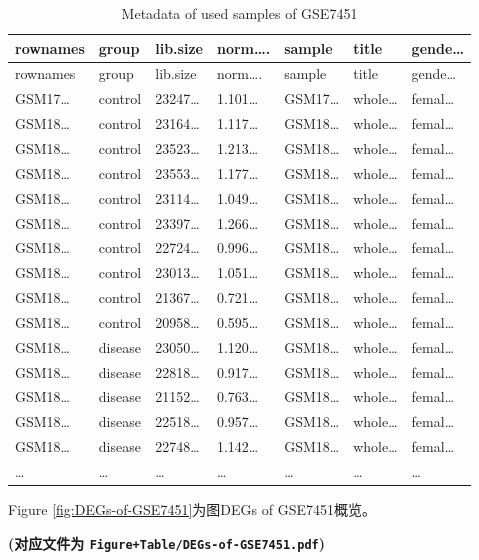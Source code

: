 \documentclass[
]{article}
\begin{document}
\begin{longtable}[]{@{}lllllll@{}}
\caption{\label{tab:metadata-of-used-samples-of-GSE7451}Metadata of used samples of GSE7451}\tabularnewline
\toprule
rownames & group & lib.size & norm\ldots. & sample & title & gende\ldots{}\tabularnewline
\midrule
\endfirsthead
\toprule
rownames & group & lib.size & norm\ldots. & sample & title & gende\ldots{}\tabularnewline
\midrule
\endhead
GSM17\ldots{} & control & 23247\ldots{} & 1.101\ldots{} & GSM17\ldots{} & whole\ldots{} & femal\ldots{}\tabularnewline
GSM18\ldots{} & control & 23164\ldots{} & 1.117\ldots{} & GSM18\ldots{} & whole\ldots{} & femal\ldots{}\tabularnewline
GSM18\ldots{} & control & 23523\ldots{} & 1.213\ldots{} & GSM18\ldots{} & whole\ldots{} & femal\ldots{}\tabularnewline
GSM18\ldots{} & control & 23553\ldots{} & 1.177\ldots{} & GSM18\ldots{} & whole\ldots{} & femal\ldots{}\tabularnewline
GSM18\ldots{} & control & 23114\ldots{} & 1.049\ldots{} & GSM18\ldots{} & whole\ldots{} & femal\ldots{}\tabularnewline
GSM18\ldots{} & control & 23397\ldots{} & 1.266\ldots{} & GSM18\ldots{} & whole\ldots{} & femal\ldots{}\tabularnewline
GSM18\ldots{} & control & 22724\ldots{} & 0.996\ldots{} & GSM18\ldots{} & whole\ldots{} & femal\ldots{}\tabularnewline
GSM18\ldots{} & control & 23013\ldots{} & 1.051\ldots{} & GSM18\ldots{} & whole\ldots{} & femal\ldots{}\tabularnewline
GSM18\ldots{} & control & 21367\ldots{} & 0.721\ldots{} & GSM18\ldots{} & whole\ldots{} & femal\ldots{}\tabularnewline
GSM18\ldots{} & control & 20958\ldots{} & 0.595\ldots{} & GSM18\ldots{} & whole\ldots{} & femal\ldots{}\tabularnewline
GSM18\ldots{} & disease & 23050\ldots{} & 1.120\ldots{} & GSM18\ldots{} & whole\ldots{} & femal\ldots{}\tabularnewline
GSM18\ldots{} & disease & 22818\ldots{} & 0.917\ldots{} & GSM18\ldots{} & whole\ldots{} & femal\ldots{}\tabularnewline
GSM18\ldots{} & disease & 21152\ldots{} & 0.763\ldots{} & GSM18\ldots{} & whole\ldots{} & femal\ldots{}\tabularnewline
GSM18\ldots{} & disease & 22518\ldots{} & 0.957\ldots{} & GSM18\ldots{} & whole\ldots{} & femal\ldots{}\tabularnewline
GSM18\ldots{} & disease & 22748\ldots{} & 1.142\ldots{} & GSM18\ldots{} & whole\ldots{} & femal\ldots{}\tabularnewline
\ldots{} & \ldots{} & \ldots{} & \ldots{} & \ldots{} & \ldots{} & \ldots{}\tabularnewline
\bottomrule
\end{longtable}

Figure \ref{fig:DEGs-of-GSE7451}为图DEGs of GSE7451概览。

\textbf{(对应文件为 \texttt{Figure+Table/DEGs-of-GSE7451.pdf})}
\end{document}
